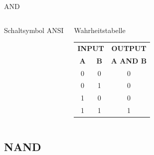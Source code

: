 \begin{frame}{AND}
\begin{columns}
    {\small Schaltsymbol ANSI}
    \begin{block}{Wahrheitstabelle}
      \begin{tabular}{cc|c}
        \multicolumn{2}{c|}{\textbf{INPUT}} & \textbf{OUTPUT} \\
        \textbf{A} & \textbf{B} & \textbf{A AND B} \\ \hline
        0 & 0 & 0 \\
        0 & 1 & 0 \\
        1 & 0 & 0 \\
        1 & 1 & 1 \\
      \end{tabular}
    \end{block}
  \end{columns}
\end{frame}

\subsection{NAND}

